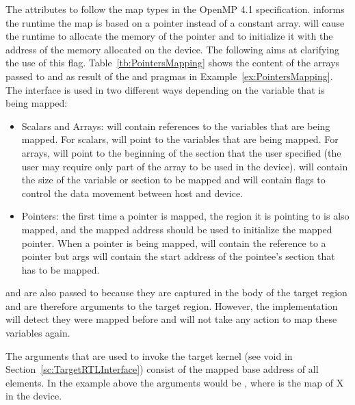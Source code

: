 The attributes  to  follow the map types in the OpenMP 4.1 specification.  informs the runtime the map is based on a pointer instead of a constant array.  will cause the runtime to allocate the memory of the pointer and to initialize it with the address of the memory allocated on the device. The following aims at clarifying the use of this flag. Table~\ref{tb:PointersMapping} shows the content of the arrays passed to  and  as result of the \dtargetdata{} and \dtarget{} pragmas in Example~\ref{ex:PointersMapping}. The interface is used in two different ways depending on the variable that is being mapped:
\begin{itemize}
  \item Scalars and Arrays:  will contain references to the variables that are being mapped. For scalars,  will point to the variables that are being mapped. For arrays,  will point to the beginning of the section that the user specified (the user may require only part of the array to be used in the device).  will contain the size of the variable or section to be mapped and  will contain flags to control the data movement between host and device.

  \item Pointers: the first time a pointer is mapped, the region it is pointing to is also mapped, and the mapped address should be used to initialize the mapped pointer. When a pointer is being mapped,  will contain the reference to a pointer but args will contain the start address of the pointee’s section that has to be mapped.

\end{itemize}

 and  are also passed to  because they are captured in the body of the target region and are therefore arguments to the target region. However, the \libomptarget{} implementation will detect they were mapped before and will not take any action to map these variables again.

The arguments that are used to invoke the target kernel (see void  in Section~\ref{sc:TargetRTLInterface}) consist of the mapped base address of all elements. In the example above the arguments would be , where  is the map of {X} in the device.

